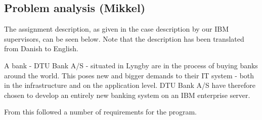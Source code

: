 \subsection{Problem analysis (Mikkel)}


The assignment description, as given in the case description by our IBM supervisors, can be seen below. Note that the description has been translated from Danish\cite{case_description} to English.

\begin{mdframed}[backgroundcolor=black!5]
A bank - DTU Bank A/S - situated in Lyngby are in the process of buying banks around the world. This poses new and bigger demands to their IT system - both in the infrastructure and on the application level. DTU Bank A/S have therefore chosen to develop an entirely new banking system on an IBM enterprise server.
\end{mdframed}
 
From this followed a number of requirements for the program. 

